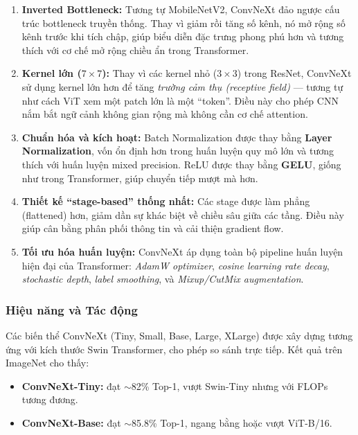 \begin{enumerate}
	\item \textbf{Inverted Bottleneck:}  
	Tương tự MobileNetV2, ConvNeXt đảo ngược cấu trúc bottleneck truyền thống. Thay vì giảm rồi tăng số kênh, nó mở rộng số kênh trước khi tích chập, giúp biểu diễn đặc trưng phong phú hơn và tương thích với cơ chế mở rộng chiều ẩn trong Transformer.
	
	\item \textbf{Kernel lớn ($7\times7$):}  
	Thay vì các kernel nhỏ ($3\times3$) trong ResNet, ConvNeXt sử dụng kernel lớn hơn để tăng \textit{trường cảm thụ (receptive field)} — tương tự như cách ViT xem một patch lớn là một “token”.  
	Điều này cho phép CNN nắm bắt ngữ cảnh không gian rộng mà không cần cơ chế attention.
	
	\item \textbf{Chuẩn hóa và kích hoạt:}  
	Batch Normalization được thay bằng \textbf{Layer Normalization}, vốn ổn định hơn trong huấn luyện quy mô lớn và tương thích với huấn luyện mixed precision.  
	ReLU được thay bằng \textbf{GELU}, giống như trong Transformer, giúp chuyển tiếp mượt mà hơn.
	
	\item \textbf{Thiết kế “stage-based” thống nhất:}  
	Các stage được làm phẳng (flattened) hơn, giảm dần sự khác biệt về chiều sâu giữa các tầng. Điều này giúp cân bằng phân phối thông tin và cải thiện gradient flow.
	
	\item \textbf{Tối ưu hóa huấn luyện:}  
	ConvNeXt áp dụng toàn bộ pipeline huấn luyện hiện đại của Transformer:  
	\textit{AdamW optimizer}, \textit{cosine learning rate decay}, \textit{stochastic depth}, \textit{label smoothing}, và \textit{Mixup/CutMix augmentation}.
\end{enumerate}

\subsubsection{Hiệu năng và Tác động}
Các biến thể ConvNeXt (Tiny, Small, Base, Large, XLarge) được xây dựng tương ứng với kích thước Swin Transformer, cho phép so sánh trực tiếp.  
Kết quả trên ImageNet cho thấy:
\begin{itemize}
	\item \textbf{ConvNeXt-Tiny:} đạt $\sim$82\% Top-1, vượt Swin-Tiny nhưng với FLOPs tương đương.
	\item \textbf{ConvNeXt-Base:} đạt $\sim$85.8\% Top-1, ngang bằng hoặc vượt ViT-B/16.
\end{itemize}

